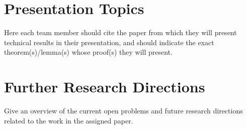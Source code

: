 \documentclass[paper=a4, fontsize=11pt]{scrartcl} %
\numberwithin{equation}{section} %
\numberwithin{figure}{section} %
\numberwithin{table}{section} %
\begin{document}

\section{Presentation Topics}

Here each team member should cite the paper from which they will present technical results in their
presentation, and should indicate the exact theorem(s)/lemma(s) whose proof(s) they will present.


\section{Further Research Directions}
Give an overview of the current open problems and future research directions related to the work in the assigned paper.






\end{document}
